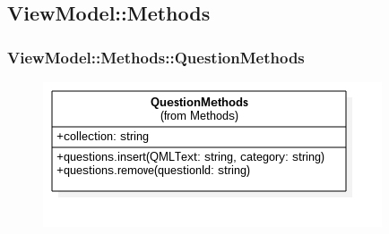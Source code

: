\newpage

\subsection{ViewModel::Methods}
\subsubsection{ViewModel::Methods::QuestionMethods}
\begin{figure}[h!]
\begin{center}
	\includegraphics[scale=0.4]{../images/ViewModel/Methods/QuestionMethods.png}
\end{center}
\end{figure}
